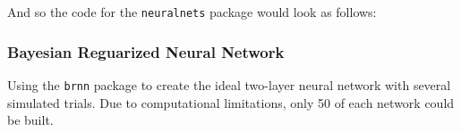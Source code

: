 And so the code for the \texttt{neuralnets} package would look as
follows:

\begin{Shaded}
\begin{Highlighting}[]
\OtherTok{\textless{}{-}} \SpecialCharTok{\textasciitilde{}}
                  \NormalTok{,}
                  \NormalTok{(}\NormalTok{),}
                  \NormalTok{,}
                  \SpecialCharTok{{-}}\NormalTok{(}\SpecialCharTok{{-}}\SpecialCharTok{+}\SpecialCharTok{*}

\OtherTok{\textless{}{-}}  \NormalTok{(}\SpecialCharTok{$}\SpecialCharTok{\%\textgreater{}\%} \NormalTok{()}
\end{Highlighting}
\end{Shaded}

\hypertarget{bayesian-reguarized-neural-network}{%
\subsubsection{Bayesian Reguarized Neural
Network}\label{bayesian-reguarized-neural-network}}

Using the \texttt{brnn} package \cite{brnn} to create the ideal
two-layer neural network with several simulated trials. Due to
computational limitations, only 50 of each network could be built.

